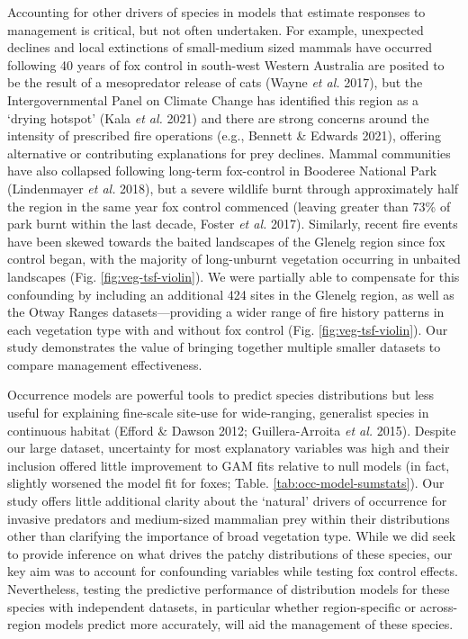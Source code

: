 \documentclass[11pt,a4paper,titlepage,twoside,openright]{style/unimelbthesis}
\begin{document}
\begin{mainmatter}
Accounting for other drivers of species in models that estimate responses to management is critical, but not often undertaken. For example, unexpected declines and local extinctions of small-medium sized mammals have occurred following 40 years of fox control in south-west Western Australia are posited to be the result of a mesopredator release of cats (Wayne \emph{et al.} 2017), but the Intergovernmental Panel on Climate Change has identified this region as a `drying hotspot' (Kala \emph{et al.} 2021) and there are strong concerns around the intensity of prescribed fire operations (e.g., Bennett \& Edwards 2021), offering alternative or contributing explanations for prey declines. Mammal communities have also collapsed following long-term fox-control in Booderee National Park (Lindenmayer \emph{et al.} 2018), but a severe wildlife burnt through approximately half the region in the same year fox control commenced (leaving greater than 73\% of park burnt within the last decade, Foster \emph{et al.} 2017). Similarly, recent fire events have been skewed towards the baited landscapes of the Glenelg region since fox control began, with the majority of long-unburnt vegetation occurring in unbaited landscapes (Fig. \ref{fig:veg-tsf-violin}). We were partially able to compensate for this confounding by including an additional 424 sites in the Glenelg region, as well as the Otway Ranges datasets---providing a wider range of fire history patterns in each vegetation type with and without fox control (Fig. \ref{fig:veg-tsf-violin}). Our study demonstrates the value of bringing together multiple smaller datasets to compare management effectiveness.

Occurrence models are powerful tools to predict species distributions but less useful for explaining fine-scale site-use for wide-ranging, generalist species in continuous habitat (Efford \& Dawson 2012; Guillera-Arroita \emph{et al.} 2015). Despite our large dataset, uncertainty for most explanatory variables was high and their inclusion offered little improvement to GAM fits relative to null models (in fact, slightly worsened the model fit for foxes; Table. \ref{tab:occ-model-sumstats}). Our study offers little additional clarity about the `natural' drivers of occurrence for invasive predators and medium-sized mammalian prey within their distributions other than clarifying the importance of broad vegetation type. While we did seek to provide inference on what drives the patchy distributions of these species, our key aim was to account for confounding variables while testing fox control effects. Nevertheless, testing the predictive performance of distribution models for these species with independent datasets, in particular whether region-specific or across-region models predict more accurately, will aid the management of these species.


\end{mainmatter}
\end{document}
